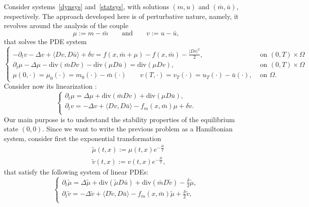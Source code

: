 \documentclass[10pt,a4paper,nouppercase,nowrite]{article}
\numberwithin{equation}{section}
\theoremstyle{definition}
\begin{document}
Consider systems~\eqref{dynsys} and~\eqref{statsys}, with solutions $(m,u)$ and $(\bar{m},\bar{u})$, respectively. The approach developed here is of perturbative nature, namely, it revolves around the analysis of the couple
	\[
	\mu:=m - \bar{m} \qquad \text{and} \qquad v:=u-\bar{u},
	\]
	that solves the PDE system
	\begin{equation*}
		\begin{cases}
			-\partial_t v - \Delta v + \langle Dv,D\bar{u} \rangle + \delta v = f(x,\bar{m}+\mu) - f(x,\bar{m}) - \frac{|Dv|^2}{2},& \text{ on } (0,T) \times \Omega \\
			\partial_t \mu - \Delta \mu - \text{div}(\bar{m}Dv) - \text{div}(\mu D\bar{u}) = \text{div}(\mu Dv),& \text{ on } (0,T) \times \Omega \\
			\mu(0,\cdot)=\mu_0(\cdot)=m_0(\cdot) - \bar{m}(\cdot) \qquad v(T,\cdot)=v_T(\cdot) = u_T(\cdot)- \bar{u}(\cdot),& \text{ on } \Omega.
		\end{cases}
	\end{equation*}
 Consider now its linearization :
	\begin{equation*}
		\begin{cases}
			\partial_t \mu = \Delta \mu + \text{div}(\bar{m}Dv) + \text{div}(\mu D\bar{u}), \\
			\partial_t v = - \Delta v + \langle Dv,D\bar{u} \rangle - f_m(x,\bar{m})\mu + \delta v. \\
		\end{cases}
	\end{equation*}
	Our main purpose is to understand the stability properties of the equilibrium state $(0,0)$. Since we want to write the previous problem as a Hamiltonian system, consider first the exponential transformation
	\begin{equation*}
		\begin{aligned}
			&\tilde{\mu}(t,x) := \mu(t,x) e^{-\frac{\delta t}{2}} \\ 
			&\tilde{v}(t,x) := v(t,x) e^{-\frac{\delta t}{2}},
		\end{aligned}
	\end{equation*}
	that satisfy the following system of linear PDEs:
	\begin{equation}
		\begin{cases}
			\partial_t \tilde{\mu} = \Delta \tilde{\mu} + \text{div}(\tilde{\mu} D\bar{u}) + \text{div}(\bar{m} D\tilde{v}) - \frac{\delta}{2} \tilde{\mu}, \\
			\partial_t \tilde{v} = - \Delta \tilde{v} + \langle D\tilde{v}, D \bar{u} \rangle - f_m(x,\bar{m}) \tilde{\mu} + \frac{\delta}{2} \tilde{v}, \\ 
		\end{cases}
		\label{deltahalf}
	\end{equation}
\end{document}
